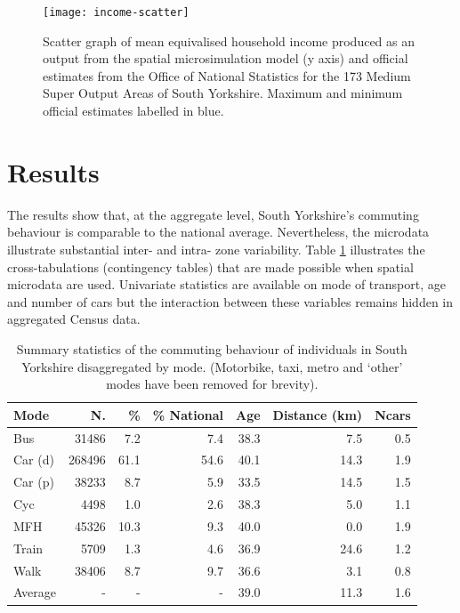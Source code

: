 \begin{figure}[h*]
 \centering
\texttt{[image: income-scatter]}
 \caption[Mean equivalised household income from official and simulated data]
 {Scatter graph of mean equivalised household income produced as an
 output from the spatial microsimulation model (y axis) and official estimates
 from the Office of National Statistics for the 173 Medium Super Output Areas
 of South Yorkshire. Maximum and minimum official estimates labelled in blue.}
 \label{fincome-scatter}
\end{figure}

\section{Results} \label{c7results}
The results show that, at the aggregate level, South Yorkshire's commuting
behaviour is comparable to the national average. Nevertheless, the
microdata illustrate substantial
inter- and intra- zone variability. Table \ref{t:sum} illustrates the
cross-tabulations (contingency tables) that are made possible
when spatial microdata are used. Univariate statistics are available on
mode of transport, age and number of cars but the interaction between these
variables remains hidden in aggregated Census data.

\begin{table}[h]
\caption[Summary statistics of the commuting behaviour of in South Yorkshire]
{Summary statistics of the commuting behaviour of individuals in South
Yorkshire disaggregated by mode. (Motorbike, taxi, metro and `other'
modes have been removed for brevity).}
\begin{center}
\begin{tabular}{lrrrrrr}
\toprule
Mode & N.  & \%  & \% National & Age & Distance (km) &
Ncars \\
\midrule
Bus & 31486 & 7.2 & 7.4 & 38.3 & 7.5 & 0.5 \\ 
Car (d) & 268496 & 61.1 & 54.6 & 40.1 & 14.3 & 1.9 \\ 
Car (p) & 38233 & 8.7 & 5.9 & 33.5 & 14.5 & 1.5 \\ 
Cyc & 4498 & 1.0 & 2.6 & 38.3 & 5.0 & 1.1 \\ 
MFH & 45326 & 10.3 & 9.3 & 40.0 & 0.0 & 1.9 \\
Train & 5709 & 1.3 & 4.6 & 36.9 & 24.6 & 1.2 \\ 
Walk & 38406 & 8.7 & 9.7 & 36.6 & 3.1 & 0.8 \\ 
Average & - & - & - & 39.0 & 11.3 & 1.6 \\
\bottomrule
\end{tabular}\end{center}
\label{t:sum}
\end{table}

